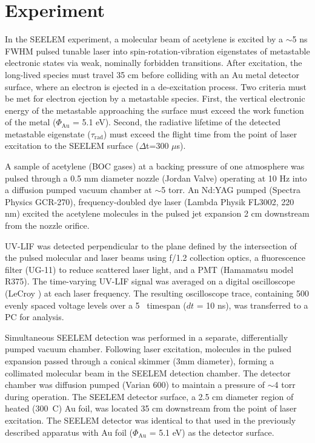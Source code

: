 \documentclass[12pt]{mitthesis}
\begin{document}
\section{Experiment}

In the SEELEM experiment, a molecular beam of acetylene is excited by
a $\sim$5 ns FWHM pulsed tunable laser into spin-rotation-vibration
eigenstates of metastable electronic states via weak, nominally
forbidden transitions. After excitation, the long-lived species must
travel 35 cm before colliding with an Au metal detector surface, where
an electron is ejected in a de-excitation process. Two criteria must
be met for electron ejection by a metastable species. First, the
vertical electronic energy of the metastable approaching the surface
must exceed the work function of the metal ($\Phi_{\text{Au}}$ = 5.1
eV). Second, the radiative lifetime of the detected metastable
eigenstate ($\tau_\text{rad}$) must exceed the flight time from the
point of laser excitation to the SEELEM surface ($\Delta$t=300
$\mu$s).

A sample of acetylene (BOC gases) at a backing pressure of one
atmosphere was pulsed through a 0.5 mm diameter nozzle (Jordan Valve)
operating at 10 Hz into a diffusion pumped vacuum chamber at
$\sim$5 torr.  An Nd:YAG pumped (Spectra Physics GCR-270),
frequency-doubled dye laser (Lambda Physik FL3002, 220 nm) excited the
acetylene molecules in the pulsed jet expansion 2 cm downstream from
the nozzle orifice.  

UV-LIF was detected perpendicular to the plane defined by the
intersection of the pulsed molecular and laser beams using f/1.2
collection optics, a fluorescence filter (UG-11) to reduce scattered
laser light, and a PMT (Hamamatsu model R375).  The time-varying
UV-LIF signal was averaged on a digital oscilloscope (LeCroy ) at each laser frequency.  The resulting oscilloscope trace,
containing 500 evenly spaced voltage levels over a 5 \microsec\
timespan ($dt$ = 10 ns), was transferred to a PC for analysis.

Simultaneous SEELEM detection was performed in a separate,
differentially pumped vacuum chamber.  Following laser excitation,
molecules in the pulsed expansion passed through a conical skimmer
(3mm diameter), forming a collimated molecular beam in the SEELEM
detection chamber.  The detector chamber was diffusion pumped (Varian
600) to maintain a pressure of $\sim$4\e{-7} torr during operation.
The SEELEM detector surface, a 2.5 cm diameter region of heated
(300\degrees\ C) Au foil, was located 35 cm downstream from the point
of laser excitation.  The SEELEM detector was identical to that used
in the previously described apparatus with Au foil ($\Phi_{\text{Au}}$
= 5.1 eV) as the detector surface.
\end{document}
